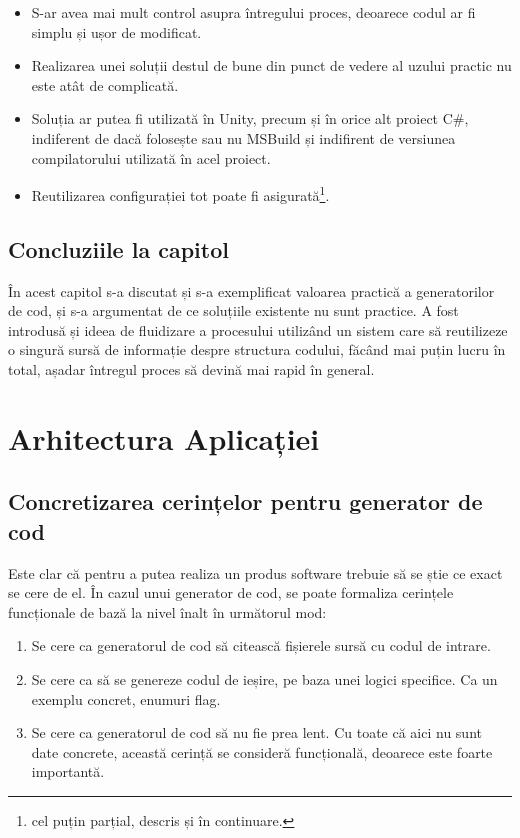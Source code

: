 \documentclass[a4paper,12pt]{report}
\newcommand\chapterConclusionSection[1]{\section{Concluziile la capitol \nameref{#1}}}
\begin{document}
\begin{itemize}
  \item S-ar avea mai mult control asupra întregului proces, deoarece codul ar fi simplu și ușor de modificat.

  \item Realizarea unei soluții destul de bune din punct de vedere al uzului practic nu este atât de complicată.

  \item Soluția ar putea fi utilizată în Unity, precum și în orice alt proiect C\#, indiferent de dacă folosește sau nu MSBuild și indifirent de versiunea compilatorului utilizată în acel proiect.

  \item Reutilizarea configurației tot poate fi asigurată\footnote{cel puțin parțial, descris și în continuare.}.
\end{itemize}

\chapterConclusionSection{intro_chapter_title}

În acest capitol s-a discutat și s-a exemplificat valoarea practică a generatorilor de cod, și s-a argumentat de ce soluțiile existente nu sunt practice.
A fost introdusă și ideea de fluidizare a procesului utilizând un sistem care să reutilizeze o singură sursă de informație despre structura codului, făcând mai puțin lucru în total, așadar întregul proces să devină mai rapid în general.

\chapter{Arhitectura Aplicației}\label{architecture_chapter_title}

\section{Concretizarea cerințelor pentru generator de cod}

Este clar că pentru a putea realiza un produs software trebuie să se știe ce exact se cere de el.
În cazul unui generator de cod, se poate formaliza cerințele funcționale de bază la nivel înalt în următorul mod:

\begin{enumerate}
  \item Se cere ca generatorul de cod să citească fișierele sursă cu codul de intrare.
  \item Se cere ca să se genereze codul de ieșire, pe baza unei logici specifice. Ca un exemplu concret, enumuri flag.
  \item Se cere ca generatorul de cod să nu fie prea lent.
        Cu toate că aici nu sunt date concrete, această cerință se consideră funcțională, deoarece este foarte importantă.
\end{enumerate}
\end{document}
